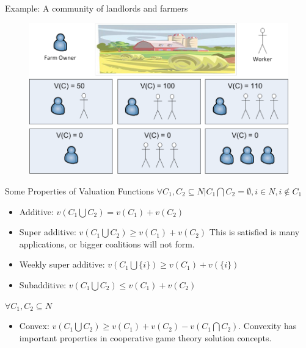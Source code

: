 \documentclass{beamer}
\begin{document}
\begin{frame}{Example: A community of landlords and farmers}
    \begin{figure}[htbp]
        \centering
        \includegraphics[width=0.9 \columnwidth]{figures/community_farm.png}
    \end{figure}
\end{frame}
\begin{frame}{Some Properties of Valuation Functions}
    $\forall C_1,C_2 \subseteq N | C_1 \bigcap C_2 = \emptyset, i \in N, i \notin C_1$
    \begin{itemize}
        \item {\color{blue} Additive:} $v(C_1 \bigcup C_2) = v(C_1) + v(C_2)$
        \item {\color{blue} Super additive:} $v(C_1 \bigcup C_2) \geq v(C_1) + v(C_2)$ This is satisfied is many applications, or bigger coalitions will not form.
        \item {\color{blue} Weekly super additive:} $v(C_1 \bigcup \{i\}) \geq v(C_1) + v(\{i\})$
        \item {\color{red} Subadditive:} $v(C_1 \bigcup C_2) \leq v(C_1) + v(C_2)$
    \end{itemize}

    $\forall C_1,C_2 \subseteq N$
    \begin{itemize}
        \item {\color{blue} Convex:} $v(C_1 \bigcup C_2) \geq v(C_1) + v(C_2) - v(C_1 \bigcap C_2)$. Convexity has important properties in cooperative game theory solution concepts.
    \end{itemize}
\end{frame}
\end{document}
